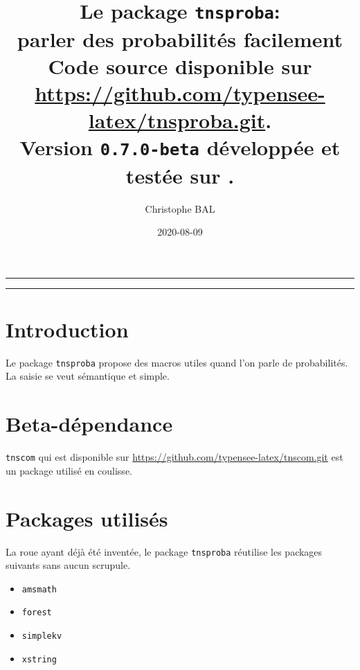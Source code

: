 \documentclass[12pt,a4paper]{article}
\theoremstyle{definition}
\begin{document}
\renewcommand\labelitemi{\raisebox{0.125em}{\tiny\textbullet}}
\renewcommand{\labelitemii}{---}

\title{  %
	Le package \texttt{tnsproba}:\\%
	parler des probabilités facilement\\%
	{\footnotesize Code source disponible sur \url{https://github.com/typensee-latex/tnsproba.git}.}\\%
{\footnotesize Version \texttt{0.7.0-beta} développée et testée sur \macosxname{}.}%
}
\author{Christophe BAL}
\date{2020-08-09}

\maketitle


\vspace{2em}

\hrule

\tableofcontents

\vspace{1.5em}

\hrule

\newpage

\section{Introduction}

Le package \verb+tnsproba+ propose des macros utiles quand l'on parle de probabilités. La saisie se veut sémantique et simple.


\section{Beta-dépendance}

\verb#tnscom# qui est disponible sur \url{https://github.com/typensee-latex/tnscom.git} est un package utilisé en coulisse.
\section{Packages utilisés}

La roue ayant déjà été inventée, le package \verb#tnsproba# réutilise les packages suivants sans aucun scrupule.

\begin{multicols}{4}
    \begin{itemize}
        \item \verb#amsmath#
        \item \verb#forest#
        \item \verb#simplekv#
        \item \verb#xstring#
    \end{itemize}
\end{multicols}
\end{document}
